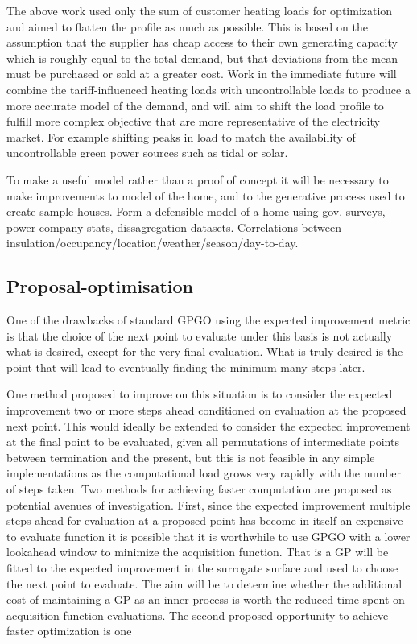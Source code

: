 \documentclass[a4paper, 10 pt, conference]{ieeeconf}  %
\begin{document}
The above work used only the sum of customer heating loads for optimization and aimed to flatten the profile as much as possible. This is based on the assumption that the supplier has cheap access to their own generating capacity which is roughly equal to the total demand, but that deviations from the mean must be purchased or sold at a greater cost. Work in the immediate future will combine the tariff-influenced heating loads with uncontrollable loads to produce a more accurate model of the demand, and will aim to shift the load profile to fulfill more complex objective that are more representative of the electricity market. For example shifting peaks in load to match the availability of uncontrollable green power sources such as tidal or solar.

To make a useful model rather than a proof of concept it will be necessary to make improvements to model of the home, and to the generative process used to create sample houses. 
Form a defensible model of a home using gov. surveys, power company stats, dissagregation datasets. Correlations between insulation/occupancy/location/weather/season/day-to-day.
\subsection{Proposal-optimisation}
One of the drawbacks of standard GPGO using the expected improvement metric is that the choice of the next point to evaluate under this basis is not actually what is desired, except for the very final evaluation. What is truly desired is the point that will lead to eventually finding the minimum many steps later.

One method proposed to improve on this situation is to consider the expected improvement two or more steps ahead conditioned on evaluation at the proposed next point. This would ideally be extended to consider the expected improvement at the final point to be evaluated, given all permutations of intermediate points between termination and the present, but this is not feasible in any simple implementations as the computational load grows very rapidly with the number of steps taken. Two methods for achieving faster computation are proposed as potential avenues of investigation. First, since the expected improvement multiple steps ahead for evaluation at a proposed point has become in itself an expensive to evaluate function it is possible that it is worthwhile to use GPGO with a lower lookahead window to minimize the acquisition function. That is a GP will be fitted to the expected improvement in the surrogate surface and used to choose the next point to evaluate. The aim will be to determine whether the additional cost of maintaining a GP as an inner process is worth the reduced time spent on acquisition function evaluations. The second proposed opportunity to achieve faster optimization is one 
\end{document}
